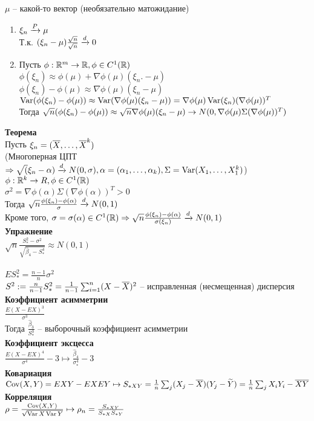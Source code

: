 \documentclass[12pt]{article}
\begin{document}
$\mu$ -- какой-то вектор (необязательно матожидание)
\begin{enumerate}
	\item $\xi_n \xrightarrow{P} \mu$\\
	Т.к. $(\xi_n - \mu)\frac{\sqrt{n}}{\sqrt{n}} \xrightarrow{d} 0$
	\item Пусть $\phi: \mathbb{R}^m \rightarrow \mathbb{R}, \phi \in C^1(\mathbb{R})$\\
	$\phi(\xi_n) \approx \phi(\mu) + \nabla \phi(\mu)(\xi_n.- \mu)$\\
	$\phi(\xi_n) - \phi(\mu) \approx \nabla\phi(\mu)(\xi_n - \mu)$\\
	$\operatorname{Var}(\phi(\xi_n) - \phi(\mu)) \approx \operatorname{Var}(\nabla \phi(\mu)(\xi_n - \mu)) = \nabla\phi(\mu)\operatorname{Var}(\xi_n) (\nabla\phi(\mu))^T$\\
	Тогда $\sqrt{n} (\phi(\xi_n)-\phi(\mu)) \approx \sqrt{n}\nabla \phi(\mu)(\xi_n - \mu) \rightarrow N(0, \nabla\phi(\mu)\Sigma(\nabla\phi(\mu))^T)$
\end{enumerate}
\textbf{Теорема}\\
Пусть $\xi_n = (\overline X, \ldots, \overline X^k)$\\
(Многоперная ЦПТ $\Rightarrow \sqrt(\xi_n - \alpha) \xrightarrow{d} N(0, \sigma), \alpha = (\alpha_1, \ldots, \alpha_k), \Sigma = \operatorname{Var}(X_1, \ldots, X_1^k)$)\\
$\phi: \mathbb{R}^k \rightarrow R, \phi \in C^1(\mathbb{R})$\\
$\sigma^2 = \nabla \phi(\alpha)\Sigma(\nabla\phi(\alpha))^T > 0$\\
Тогда $\sqrt{n} \frac{\phi(\xi_n)-\phi(\alpha)}{\sigma} \xrightarrow{d} N(0, 1)$\\
Кроме того, $\sigma = \sigma(\alpha) \in C^1(\mathbb{R}) \Rightarrow \sqrt{n}\frac{\phi(\xi_n)-\phi(\alpha)}{\sigma(\xi_n)} \xrightarrow{d} N(0,1)$\\
\textbf{Упражнение}\\
$\sqrt{n}\frac{S_*^2 - \sigma^2}{\sqrt{\widehat \beta_4 - S_*^4}} \approx N(0,1)$\\\\
$ES_*^2 = \frac{n-1}{n}\sigma^2$\\
$S^2 := \frac{n}{n-1}S_*^2 = \frac{1}{n-1}\sum_{i=1}^n (X - \overline X)^2$ -- исправленная (несмещенная) дисперсия\\
\textbf{Коэффициент асимметрии}\\
$\frac{E(X-EX)^3}{\sigma^3}$\\
Тогда $\frac{\widehat \beta_3}{S_*^3}$ -- выборочный коэффициент асимметрии\\
\textbf{Коэффициент эксцесса}\\
$\frac{E(X-EX)^4}{\sigma^4} - 3 \mapsto \frac{\widehat \beta_4}{\sigma^4_*} -3$\\
\textbf{Ковариация}\\
$\operatorname{Cov}(X, Y) = EXY- EXEY \mapsto S_{*XY} = \frac1n \sum_j (X_j - \overline X)(Y_j - \widetilde Y) = \frac1n \sum_j X_iY_i - \overline X \overline Y$\\
\textbf{Корреляция}\\
$\rho = \frac{\operatorname{Cov}(X,Y)}{\sqrt{\operatorname{Var} X \operatorname{Var} Y}}\mapsto \rho_n = \frac{S_{*XY}}{S_{*X}S_{*Y}}$
\end{document}
